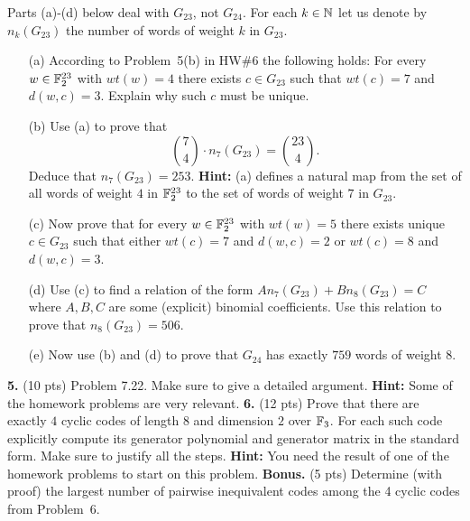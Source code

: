 \documentclass[12pt]{amsart}
\begin{document}
Parts (a)-(d) below deal with $G_{23}$, not $G_{24}$. For each $k\in{\mathbb N}$ let us denote by $n_k(G_{23})$ the number of words of weight $k$ in $G_{23}$.
\begin{itemize}
\item[(a)] According to Problem~5(b) in HW\#6 the following holds: For every $w\in {\mathbb F}_2^{23}$ with $wt(w)=4$ there exists $c\in G_{23}$
such that $wt(c)=7$ and $d(w,c)=3$. Explain why such $c$ must be unique.
\item[(b)] Use (a) to prove that $${7 \choose 4}\cdot n_{7}(G_{23})={23 \choose 4}.$$ Deduce that
$n_7(G_{23})=253$. {\bf Hint:} (a) defines a natural map from the set of all words of weight $4$ in ${\mathbb F}_2^{23}$ to the set of words of weight $7$ in $G_{23}$.


\item[(c)] Now prove that for every $w\in {\mathbb F}_2^{23}$ with $wt(w)=5$ there exists unique $c\in G_{23}$ such that either $wt(c)=7$ and $d(w,c)=2$ or $wt(c)=8$ and $d(w,c)=3$. 
\item[(d)] Use (c) to find a relation of the form $A n_7(G_{23}) + B n_8(G_{23})=C$ where $A,B,C$ are some (explicit) binomial coefficients. Use this relation to prove that $n_8(G_{23})=506$.
\item[(e)] Now use (b) and (d) to prove that $G_{24}$ has exactly $759$ words of weight $8$.
\end{itemize}
\skv
{\bf 5.} (10 pts) Problem 7.22. Make sure to give a detailed argument. {\bf Hint:} Some of the homework problems are very relevant.
\skv
{\bf 6.} (12 pts) Prove that there are exactly $4$ cyclic codes of length $8$ and dimension $2$ over ${\mathbb F}_3$. For each such code explicitly compute its generator polynomial and generator matrix in the standard form. Make sure to justify all the steps. {\bf Hint:} You need the result of one of the homework problems to start on this problem.
\skv
{\bf Bonus.} (5 pts) Determine (with proof) the largest number of pairwise inequivalent codes among the 4 cyclic codes from Problem~6.
\end{document}
